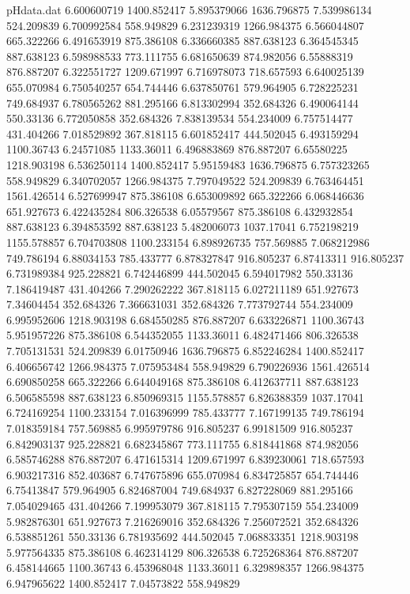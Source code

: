 \begin{filecontents}{pHdata.dat}
6.600600719	1400.852417
5.895379066	1636.796875
7.539986134	524.209839
6.700992584	558.949829
6.231239319	1266.984375
6.566044807	665.322266
6.491653919	875.386108
6.336660385	887.638123
6.364545345	887.638123
6.598988533	773.111755
6.681650639	874.982056
6.55888319	876.887207
6.322551727	1209.671997
6.716978073	718.657593
6.640025139	655.070984
6.750540257	654.744446
6.637850761	579.964905
6.728225231	749.684937
6.780565262	881.295166
6.813302994	352.684326
6.490064144	550.33136
6.772050858	352.684326
7.838139534	554.234009
6.757514477	431.404266
7.018529892	367.818115
6.601852417	444.502045
6.493159294	1100.36743
6.24571085	1133.36011
6.496883869	876.887207
6.65580225	1218.903198
6.536250114	1400.852417
5.95159483	1636.796875
6.757323265	558.949829
6.340702057	1266.984375
7.797049522	524.209839
6.763464451	1561.426514
6.527699947	875.386108
6.653009892	665.322266
6.068446636	651.927673
6.422435284	806.326538
6.05579567	875.386108
6.432932854	887.638123
6.394853592	887.638123
5.482006073	1037.17041
6.752198219	1155.578857
6.704703808	1100.233154
6.898926735	757.569885
7.068212986	749.786194
6.88034153	785.433777
6.878327847	916.805237
6.87413311	916.805237
6.731989384	925.228821
6.742446899	444.502045
6.594017982	550.33136
7.186419487	431.404266
7.290262222	367.818115
6.027211189	651.927673
7.34604454	352.684326
7.366631031	352.684326
7.773792744	554.234009
6.995952606	1218.903198
6.684550285	876.887207
6.633226871	1100.36743
5.951957226	875.386108
6.544352055	1133.36011
6.482471466	806.326538
7.705131531	524.209839
6.01750946	1636.796875
6.852246284	1400.852417
6.406656742	1266.984375
7.075953484	558.949829
6.790226936	1561.426514
6.690850258	665.322266
6.644049168	875.386108
6.412637711	887.638123
6.506585598	887.638123
6.850969315	1155.578857
6.826388359	1037.17041
6.724169254	1100.233154
7.016396999	785.433777
7.167199135	749.786194
7.018359184	757.569885
6.995979786	916.805237
6.99181509	916.805237
6.842903137	925.228821
6.682345867	773.111755
6.818441868	874.982056
6.585746288	876.887207
6.471615314	1209.671997
6.839230061	718.657593
6.903217316	852.403687
6.747675896	655.070984
6.834725857	654.744446
6.75413847	579.964905
6.824687004	749.684937
6.827228069	881.295166
7.054029465	431.404266
7.199953079	367.818115
7.795307159	554.234009
5.982876301	651.927673
7.216269016	352.684326
7.256072521	352.684326
6.538851261	550.33136
6.781935692	444.502045
7.068833351	1218.903198
5.977564335	875.386108
6.462314129	806.326538
6.725268364	876.887207
6.458144665	1100.36743
6.453968048	1133.36011
6.329898357	1266.984375
6.947965622	1400.852417
7.04573822	558.949829

\end{filecontents}
